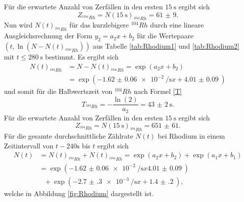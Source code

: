 Für die erwartete Anzahl von Zerfällen in den ersten $\SI{15}{\second}$ ergibt sich
\begin{equation}
	Z_{^{104i}Rh} = N(\SI{15}{\second})_{^{104i}Rh}=\num{61(9)}\text{.}
\end{equation}
Nun wird $N(t)_{^{104}Rh}$ für das kurzlebigere $^{104} Rh$ durch eine lineare Ausgleichsrechnung der Form $y_2=a_2 x+b_2$ für die Wertepaare $(t,\ln(N-N(t)_{^{104i}Rh}))$ aus Tabelle \ref{tab:Rhodium1} und \ref{tab:Rhodium2}  mit $t\le \SI{280}{\second}$ bestimmt.
Es ergibt sich
\begin{align}
N(t)_{^{104}Rh} &= N-N(t)_{^{104i}Rh} = \exp\left(a_2 x + b_2\right) \\
 &= \exp\left(-\SI{1.62(6)e-2}{\per\second} x + \SI{4.01(9)}{}\right)
\end{align}
und somit für die Halbwertszeit von $^{104} Rh$ nach Formel \eqref{T}
\begin{equation}
T_{^{104}Rh} = -\frac{\ln(2)}{a_2}=\SI{43(2)}{\second}\text{.}
\end{equation}
Für die erwartete Anzahl von Zerfällen in den ersten $\SI{15}{\second}$ ergibt sich
\begin{equation}
Z_{^{104}Rh} = N(\SI{15}{\second})_{^{104}Rh}=\num{651(61)}\text{.}
\end{equation}
Für die gesamte durchschnittliche Zählrate $N(t)$ bei Rhodium in einem Zeitintervall von $t-240\si{\second}$ bis $t$ ergibt sich
\begin{align}
N(t)&=N(t)_{^{104}Rh}+N(t)_{^{104i}Rh} =  \exp\left(a_2 x + b_2\right)+\exp\left(a_1 x + b_1\right) \\
&= \exp\left(-\SI{1.62(6)e-2}{\per\second} x \SI{4.01(9)}{}\right) \\
&\text{ }+\exp\left(-\SI{2.7(3)e-3}{\per\second} x + \SI{1.4(2)}{}\right)\text{,}
\end{align}
welche in Abbildung \ref{fig:Rhodium} dargestellt ist.

